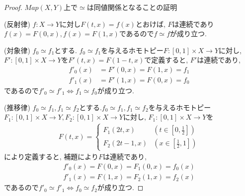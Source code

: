 \documentclass[i]{jsarticle}
\begin{document}
\begin{proof}{$Map(X, Y)$上で$\simeq$は同値関係となることの証明}

(反射律) $f:X\to Y$に対し$F(t,x)=f(x)$とおけば, $F$は連続であり$f(x)=F(0,x), f(x)=F(1,x)$であるので$f\simeq f$が成り立つ.

(対象律) $f_{0}\simeq f_{1}$とする.
$f_{0}\simeq f_{1}$を与えるホモトピー$F: [0,1]\times X\to Y$に対し,
$F': [0,1]\times X\to Y$を$F'(t,x)=F(1-t,x)$で定義すると, $F'$は連続であり,
\begin{align*}
  f'_{0}(x)&=F'(0, x)=F(1,x)=f_{1} \\
  f'_{1}(x)&=F'(1, x)=F(0,x)=f_{0}
\end{align*}
であるので$f'_{0}\simeq f'_{1} \iff f_{1}\simeq f_{0}$が成り立つ.

(推移律) $f_{0}\simeq f_{1}, f_{1}\simeq f_{2}$とする.$f_{0}\simeq f_{1}, f_{1}\simeq f_{2}$を与えるホモトピー$F_{1}: [0,1]\times X\to Y, F_{2}: [0,1]\times X\to Y$に対し,
$F_{1}: [0,1]\times X\to Y$を
\begin{align*}
  F(t, x) =
  \begin{cases}
  F_{1}(2t, x) & (t \in [0, \frac{1}{2}])\\
  F_{2}(2t-1,x) & (x \in [\frac{1}{2}, 1])
  \end{cases}
\end{align*}
により定義すると, 補題により$F$は連続であり,
\begin{align*}
f'_{0}(x)=F(0, x)=F_{1}(0, x)=f_{0}(x) \\
f'_{1}(x)=F(1, x)=F_{2}(1, x)=f_{2}(x)
\end{align*}
であるので$f'_{0}\simeq f'_{1} \iff f_{0}\simeq f_{2}$が成り立つ.
\end{proof}
\end{document}
